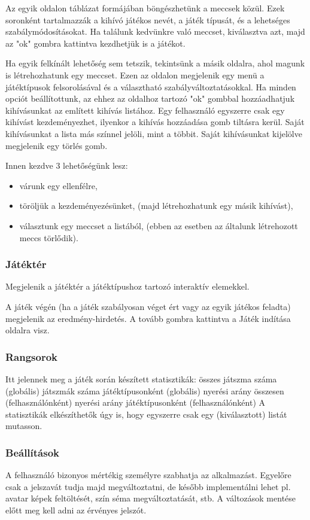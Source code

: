 Az egyik oldalon táblázat formájában böngészhetünk a meccsek közül. Ezek soronként tartalmazzák a kihívó játékos nevét, a játék típusát, és a lehetséges szabálymódosításokat. Ha találunk kedvünkre való meccset, kiválasztva azt, majd az "ok" gombra kattintva kezdhetjük is a játékot.

Ha egyik felkínált lehetőség sem tetszik, tekintsünk a másik oldalra, ahol magunk is létrehozhatunk egy meccset. Ezen az oldalon megjelenik egy menü a játéktípusok felsorolásával és a választható szabályváltoztatásokkal. Ha minden opciót beállítottunk, az ehhez az oldalhoz tartozó "ok" gombbal hozzáadhatjuk kihívásunkat az említett kihívás listához. Egy felhasználó egyszerre csak egy kihívást kezdeményezhet, ilyenkor a kihívás hozzáadása gomb tiltásra kerül. Saját kihívásunkat a lista más színnel jelöli, mint a többit. Saját kihívásunkat kijelölve megjelenik egy törlés gomb. 

Innen kezdve 3 lehetőségünk lesz:
\begin{itemize}
	\item várunk egy ellenfélre,
	\item töröljük a kezdeményezésünket, (majd létrehozhatunk egy másik kihívást),
	\item választunk egy meccset a listából, (ebben az esetben az általunk létrehozott meccs törlődik).
\end{itemize}

\subsubsection{Játéktér}
Megjelenik a játéktér a játéktípushoz tartozó interaktív elemekkel.

A játék végén (ha a játék szabályosan véget ért vagy az egyik játékos feladta) megjelenik az eredmény-hirdetés. A tovább gombra kattintva a Játék indítása oldalra visz.

\subsubsection{Rangsorok}
Itt jelennek meg a játék során készített statisztikák:
összes játszma száma (globális)
játszmák száma játéktípusonként (globális)
nyerési arány összesen (felhasználónként)
nyerési arány játéktípusonként (felhasználónként)
A statisztikák elkészíthetők úgy is, hogy egyszerre csak egy (kiválasztott) listát mutasson.

\subsubsection{Beállítások}
A felhasználó bizonyos mértékig személyre szabhatja az alkalmazást. Egyelőre csak a jelszavát tudja majd megváltoztatni, de később implementálni lehet pl. avatar képek feltöltését, szín séma megváltoztatását, stb. A változások mentése előtt meg kell adni az érvényes jelszót.

